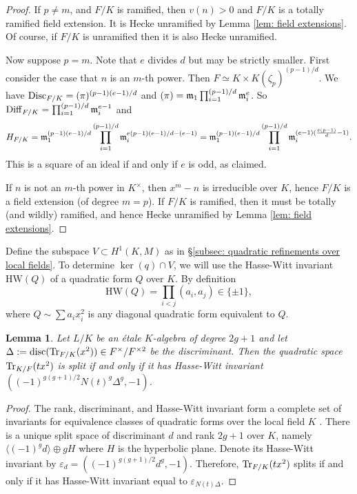 \documentclass[11pt,a4paper]{amsart}
\def\m{{\rm \mathfrak{m}}}
\def\Tr{{\rm Tr}}
\def\Disc{{\rm Disc}}
\def\disc{{\rm disc}}
\numberwithin{equation}{section}
\newtheorem{lemma}[theorem]{Lemma}
\begin{document}
\begin{proof}
    If $p \neq m$, and $F/K$ is ramified, then $v(n) > 0$ and $F/K$ is a totally ramified field extension. It is Hecke unramified by Lemma \ref{lem: field extensions}.  Of course, if $F/K$ is unramified then it is also Hecke unramified.

    Now suppose $p = m$. Note that $e$ divides $d$ but may be strictly smaller.  First consider the case that $n$ is an $m$-th power. Then $F \simeq K \times K(\zeta_p)^{(p-1)/d}$. We have $\Disc_{F/K} = (\pi)^{(p-1)(e-1)/d}$ and $(\pi) = \m_1 \prod_{i = 1}^{(p-1)/d} \m_i^e$. So $\mathrm{Diff}_{F/K} = \prod_{i =1}^{(p-1)/d} \m_i^{e-1}$ and 
    \[H_{F/K} = \m_1^{(p-1)(e-1)/d}\prod_{i = 1}^{(p-1)/d} \m_i^{e(p-1)(e-1)/d - (e-1)} = \m_1^{(p-1)(e-1)/d}\prod_{i = 1}^{(p-1)/d} \m_i^{(e-1)(\frac{e(p-1)}{d} - 1)}.\]
    This is a square of an ideal if and only if $e$ is odd, as claimed.

    If $n$ is not an $m$-th power in $K^\times$, then $x^m - n$ is irreducible over $K$, hence $F/K$ is a field extension (of degree $m = p$). If $F/K$  is ramified, then it must be totally (and wildly) ramified, and hence Hecke unramified by Lemma \ref{lem: field extensions}. 
\end{proof}

Define the subspace $V \subset H^1(K, M)$ as in \S\ref{subsec: quadratic refinements over local fields}. 
 To determine $\ker(q) \cap V$, we will use the Hasse-Witt invariant $\mathrm{HW}(Q)$ of a quadratic form $Q$ over $K$. By definition 
 \[\mathrm{HW}(Q) = \prod_{i < j} (a_i, a_j) \in \{\pm 1\},\] 
 where $Q \sim \sum a_ix_i^2$ is any diagonal quadratic form equivalent to $Q$.  


\begin{lemma}\label{lem: Hasse-Witt}
Let $L/K$ be an \'etale $K$-algebra of degree $2g+1$ and let $\Delta := \disc(\Tr_{F/K}(x^2)) \in F^\times/F^{\times 2}$ be the discriminant. Then the quadratic space $\Tr_{K/F}(tx^2)$ is split if and only if it has Hasse-Witt invariant $((-1)^{g(g+1)/2}N(t)^g\Delta^g,-1)$.
\end{lemma}
\begin{proof}
The rank, discriminant, and Hasse-Witt invariant form a complete set of invariants for equivalence classes of quadratic forms over the local field $K$ \cite{MR522835}. There is a unique split space of discriminant $d$ and rank $2g+1$ over $K$, namely $\langle (-1)^gd \rangle \oplus gH$ where $H$ is the hyperbolic plane. Denote its Hasse-Witt invariant by $\varepsilon_d = ((-1)^{g(g+1)/2}d^g,-1)$. Therefore, $\Tr_{F/K}(tx^2)$ splits if and only if it has Hasse-Witt invariant equal to $\varepsilon_{N(t)\Delta}$. 
\end{proof}
\end{document}
